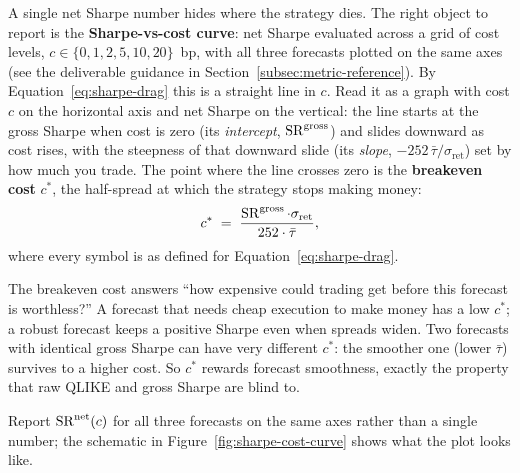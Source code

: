 A single net Sharpe number hides where the strategy dies. The right object to report is the \textbf{Sharpe-vs-cost curve}: net Sharpe evaluated across a grid of cost levels, $c \in \{0, 1, 2, 5, 10, 20\}$~bp, with all three forecasts plotted on the same axes (see the deliverable guidance in Section~\ref{subsec:metric-reference}). By Equation~\eqref{eq:sharpe-drag} this is a straight line in $c$. Read it as a graph with cost $c$ on the horizontal axis and net Sharpe on the vertical: the line starts at the gross Sharpe when cost is zero (its \emph{intercept}, $\operatorname{SR}^{\text{gross}}$) and slides downward as cost rises, with the steepness of that downward slide (its \emph{slope}, $-252\,\bar\tau/\sigma_{\text{ret}}$) set by how much you trade. The point where the line crosses zero is the \textbf{breakeven cost} $c^\ast$, the half-spread at which the strategy stops making money:
\begin{equation}
\label{eq:breakeven}
c^\ast \;=\; \frac{\operatorname{SR}^{\text{gross}} \cdot \sigma_{\text{ret}}}{252 \cdot \bar\tau},
\end{equation}
where every symbol is as defined for Equation~\eqref{eq:sharpe-drag}.

\begin{intuition}
The breakeven cost answers ``how expensive could trading get before this forecast is worthless?'' A forecast that needs cheap execution to make money has a low $c^\ast$; a robust forecast keeps a positive Sharpe even when spreads widen. Two forecasts with identical gross Sharpe can have very different $c^\ast$: the smoother one (lower $\bar\tau$) survives to a higher cost. So $c^\ast$ rewards forecast smoothness, exactly the property that raw QLIKE and gross Sharpe are blind to.
\end{intuition}

Report $\operatorname{SR}^{\text{net}}(c)$ for all three forecasts on the same axes rather than a single number; the schematic in Figure~\ref{fig:sharpe-cost-curve} shows what the plot looks like.

